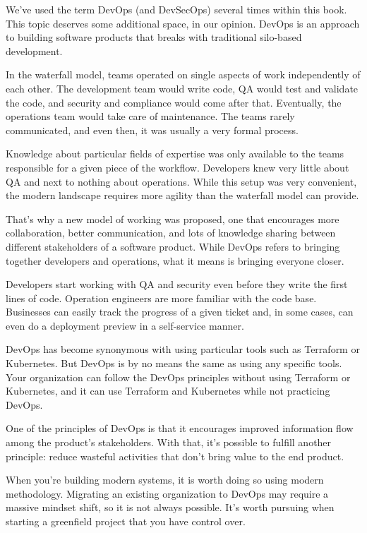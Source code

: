We've used the term DevOps (and DevSecOps) several times within this book. This topic deserves some additional space, in our opinion. DevOps is an approach to building software products that breaks with traditional silo-based development.

In the waterfall model, teams operated on single aspects of work independently of each other. The development team would write code, QA would test and validate the code, and security and compliance would come after that. Eventually, the operations team would take care of maintenance. The teams rarely communicated, and even then, it was usually a very formal process.

Knowledge about particular fields of expertise was only available to the teams responsible for a given piece of the workflow. Developers knew very little about QA and next to nothing about operations. While this setup was very convenient, the modern landscape requires more agility than the waterfall model can provide.

That's why a new model of working was proposed, one that encourages more collaboration, better communication, and lots of knowledge sharing between different stakeholders of a software product. While DevOps refers to bringing together developers and operations, what it means is bringing everyone closer.

Developers start working with QA and security even before they write the first lines of code. Operation engineers are more familiar with the code base. Businesses can easily track the progress of a given ticket and, in some cases, can even do a deployment preview in a self-service manner.

DevOps has become synonymous with using particular tools such as Terraform or Kubernetes. But DevOps is by no means the same as using any specific tools. Your organization can follow the DevOps principles without using Terraform or Kubernetes, and it can use Terraform and Kubernetes while not practicing DevOps.

One of the principles of DevOps is that it encourages improved information flow among the product's stakeholders. With that, it's possible to fulfill another principle: reduce wasteful activities that don't bring value to the end product.

When you're building modern systems, it is worth doing so using modern methodology. Migrating an existing organization to DevOps may require a massive mindset shift, so it is not always possible. It's worth pursuing when starting a greenfield project that you have control over.